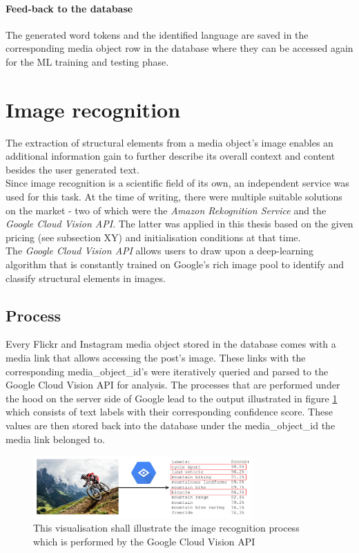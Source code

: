 \paragraph*{Feed-back to the database}
The generated word tokens and the identified language are saved in the corresponding media object row in the database where they can be accessed again for the ML training and testing phase.

\section{Image recognition} \label{image_recognition}
The extraction of structural elements from a media object's image enables an additional information gain to further describe its overall context and content besides the user generated text.\\
\newline
Since image recognition is a scientific field of its own, an independent service was used for this task. At the time of writing, there were multiple suitable solutions on the market - two of which were the \textit{Amazon Rekognition Service} and the \textit{Google Cloud Vision API}. The latter was applied in this thesis based on the given pricing (see subsection XY) and initialisation conditions at that time.\\
The \textit{Google Cloud Vision API} allows users to draw upon a deep-learning algorithm that is constantly trained on Google's rich image pool to identify and classify structural elements in images.

\subsection{Process}
Every Flickr and Instagram media object stored in the database comes with a media link that allows accessing the post's image. 
These links with the corresponding media\_object\_id's were iteratively queried and parsed to the Google Cloud Vision API for analysis. The processes that are performed under the hood on the server side of Google lead to the output illustrated in figure \ref{fig:vision_illustration} which consists of text labels with their corresponding confidence score. These values are then stored back into the database under the media\_object\_id the media link belonged to.

\begin{figure}[h]
   \centering
   \includegraphics[width=0.75\textwidth]{img/vision_illustration}
   \caption{This visualisation shall illustrate the image recognition process which is performed by the Google Cloud Vision API \parencite{Allaboutlimassol2015}}
   \label{fig:vision_illustration}
\end{figure}

